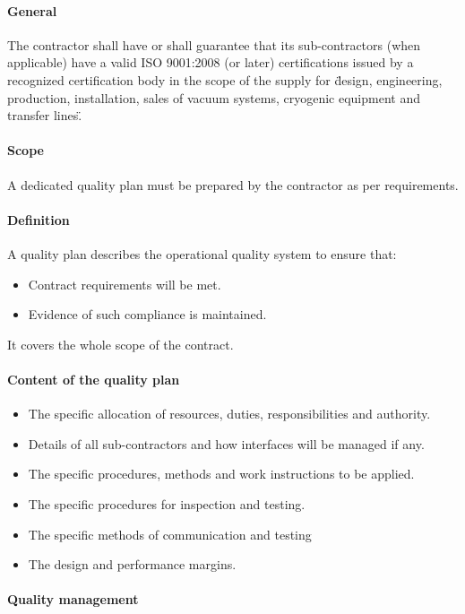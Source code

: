 \paragraph{General}

The contractor shall have or shall guarantee that its sub-contractors (when applicable) have a valid ISO 9001:2008 (or later) certifications issued by a recognized certification body in the scope of the supply for \"design, engineering, production, installation, sales of vacuum systems, cryogenic equipment and transfer lines\".

\paragraph{Scope}
A dedicated quality plan must be prepared by the contractor as per requirements.

\paragraph{Definition}
A quality plan describes the operational quality system to ensure that:
\begin{itemize}
\item Contract requirements will be met.
\item Evidence of such compliance is maintained.
\end{itemize}
It covers the whole scope of the contract.

\paragraph{Content of the quality plan}
\begin{itemize}
\item The specific allocation of resources, duties, responsibilities and authority.
\item Details of all sub-contractors and how interfaces will be managed if any.
\item The specific procedures, methods and work instructions to be applied.
\item The specific procedures for inspection and testing.
\item The specific methods of communication and testing
\item The design and performance margins.
\end{itemize}


\paragraph{Quality management}

